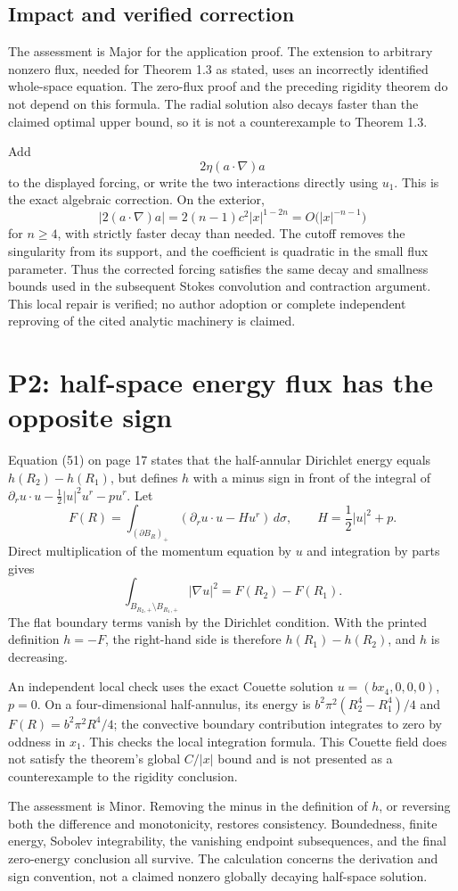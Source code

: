 \documentclass[10pt]{article}
\begin{document}
\subsection*{Impact and verified correction}
The assessment is Major for the application proof. The extension to arbitrary nonzero flux, needed for Theorem 1.3 as stated, uses an incorrectly identified whole-space equation. The zero-flux proof and the preceding rigidity theorem do not depend on this formula. The radial solution also decays faster than the claimed optimal upper bound, so it is not a counterexample to Theorem 1.3.\par
Add \[2\eta(a\cdot\nabla)a\] to the displayed forcing, or write the two interactions directly using \(u_1\). This is the exact algebraic correction. On the exterior, \[|2(a\cdot\nabla)a|=2(n-1)c^2|x|^{1-2n}
=O\bigl(|x|^{-n-1}\bigr)\] for \(n\geq4\), with strictly faster decay than needed. The cutoff removes the singularity from its support, and the coefficient is quadratic in the small flux parameter. Thus the corrected forcing satisfies the same decay and smallness bounds used in the subsequent Stokes convolution and contraction argument. This local repair is verified; no author adoption or complete independent reproving of the cited analytic machinery is claimed.\par
\section*{P2: half-space energy flux has the opposite sign}
Equation (51) on page 17 states that the half-annular Dirichlet energy equals \(h(R_2)-h(R_1)\), but defines \(h\) with a minus sign in front of the integral of \(\partial_r u\cdot u-\tfrac12|u|^2u^r-pu^r\). Let \[F(R)=\int_{(\partial B_R)_+}
\left(\partial_r u\cdot u-Hu^r\right)\,d\sigma,
\qquad H=\frac12|u|^2+p.\] Direct multiplication of the momentum equation by \(u\) and integration by parts gives \[\int_{B_{R_2,+}\setminus B_{R_1,+}}|\nabla u|^2
=F(R_2)-F(R_1).\] The flat boundary terms vanish by the Dirichlet condition. With the printed definition \(h=-F\), the right-hand side is therefore \(h(R_1)-h(R_2)\), and \(h\) is decreasing.\par
An independent local check uses the exact Couette solution \(u=(b x_4,0,0,0)\), \(p=0\). On a four-dimensional half-annulus, its energy is \(b^2\pi^2(R_2^4-R_1^4)/4\) and \(F(R)=b^2\pi^2R^4/4\); the convective boundary contribution integrates to zero by oddness in \(x_1\). This checks the local integration formula. This Couette field does not satisfy the theorem’s global \(C/|x|\) bound and is not presented as a counterexample to the rigidity conclusion.\par
The assessment is Minor. Removing the minus in the definition of \(h\), or reversing both the difference and monotonicity, restores consistency. Boundedness, finite energy, Sobolev integrability, the vanishing endpoint subsequences, and the final zero-energy conclusion all survive. The calculation concerns the derivation and sign convention, not a claimed nonzero globally decaying half-space solution.\par
\end{document}
